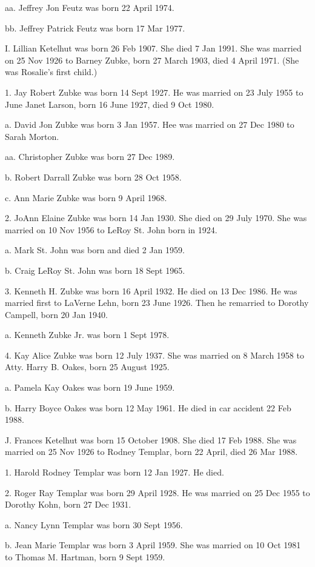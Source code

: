 \documentclass[a4paper]{article}
\begin{document}
aa. Jeffrey Jon Feutz was born 22 April 1974.

bb. Jeffrey Patrick Feutz was born 17 Mar 1977.

I.  Lillian Ketelhut was born 26 Feb 1907.  She died 7 Jan 1991.  She was married on 25 Nov 1926 to Barney Zubke, born 27 March 1903, died 4 April 1971.  (She was Rosalie's first child.)

1. Jay Robert Zubke was born 14 Sept 1927.  He was married on 23 July 1955 to June Janet Larson, born 16 June 1927, died 9 Oct 1980.

a. David Jon Zubke was born 3 Jan 1957.  Hee was married on 27 Dec 1980 to Sarah Morton.

aa. Christopher Zubke was born 27 Dec 1989.

b.  Robert Darrall Zubke was born 28 Oct 1958.  

c. Ann Marie Zubke was born 9 April 1968.

2. JoAnn Elaine Zubke was born 14 Jan 1930.  She died on 29 July 1970.  She was married on 10 Nov 1956 to LeRoy St. John born in 1924.

a. Mark St. John was born and died 2 Jan 1959.

b. Craig LeRoy St. John was born 18 Sept 1965.

3. Kenneth H. Zubke was born 16 April 1932.  He died on 13 Dec 1986.  He was married first to LaVerne Lehn, born 23 June 1926.  Then he remarried to Dorothy Campell, born 20 Jan 1940.  

a. Kenneth Zubke Jr. was born 1 Sept 1978.

4. Kay Alice Zubke was born 12 July 1937.  She was married on 8 March 1958 to Atty. Harry B. Oakes, born 25 August 1925. 

a. Pamela Kay Oakes was born 19 June 1959.

b. Harry Boyce Oakes was born 12 May 1961.  He died in car accident 22 Feb 1988.

J. Frances Ketelhut was born 15 October 1908.  She died 17 Feb 1988.  She was married on 25 Nov 1926 to Rodney Templar, born 22 April, died 26 Mar 1988.

1. Harold Rodney Templar was born 12 Jan 1927.  He died.

2. Roger Ray Templar was born 29 April 1928.  He was married on 25 Dec 1955 to Dorothy Kohn, born 27 Dec 1931.

a. Nancy Lynn Templar was born 30 Sept 1956.

b. Jean Marie Templar was born 3 April 1959.  She was married on 10 Oct 1981 to Thomas M. Hartman, born 9 Sept 1959.
\end{document}
